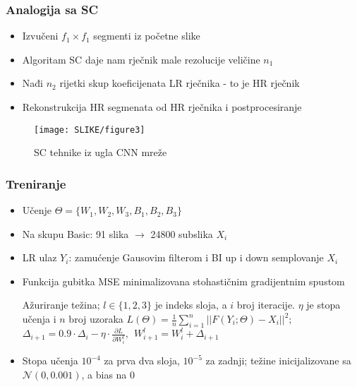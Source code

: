\documentclass{beamer}
\begin{document}
\begin{frame}
\frametitle{Analogija sa SC}
\begin{itemize}
\item Izvučeni $f_1 \times f_1$ segmenti iz početne slike
\item Algoritam SC daje nam rječnik male rezolucije veličine $n_1$
\item Nađi $n_2$ rijetki skup koeficijenata LR rječnika - to je HR rječnik
\item Rekonstrukcija HR segmenata od HR rječnika i postprocesiranje
\end{itemize}
\begin{figure}[h]
\texttt{[image: SLIKE/figure3]}
\centering
\caption{SC tehnike iz ugla CNN mreže}
\label{fig:rep}
\end{figure}

\end{frame}



\begin{frame}
\frametitle{Treniranje}
\begin{itemize}
\item Učenje $\Theta = \{W_1 , W_2 , W_3 , B_1 , B_2 , B_3\}$
\item Na skupu Basic: 91 slika $\rightarrow$  24800 subslika $X_i$
\item LR ulaz $Y_i$: zamućenje Gausovim filterom i BI up i down semplovanje $X_i$
\item Funkcija gubitka MSE minimalizovana stohastičnim gradijentnim spustom
\begin{block}{Ažuriranje težina; $l \in \{ 1, 2, 3 \}$ je indeks sloja, a $i$ broj iteracije. $\eta$ je stopa učenja i $n$ broj uzoraka}
 $L(\Theta) = \frac{1}{n} \sum\limits_{i=1}^{n}{||F(Y_i; \Theta) - X_i ||}^2;$
 $\Delta_{i+1} = 0.9 \cdot \Delta_i - \eta \cdot \frac{\partial L}{\partial W_{i}^{l}}, \ \ W_{i+1}^{l}=W_{i}^{l}+\Delta_{i+1}$
\end{block}
\item Stopa učenja $10^{-4}$ za prva dva sloja, $10^{-5}$ za zadnji; težine inicijalizovane sa  $\mathcal{N}(0, 0.001)$, a bias na $0$
\end{itemize}
\end{frame}
\end{document}
